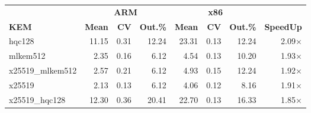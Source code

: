 \begin{table}[!ht]
\begin{tabular}{lrrr|rrr|r}
 \toprule
& \multicolumn{3}{c}{\bfseries ARM} & \multicolumn{3}{c}{\bfseries x86} &\\
\cmidrule(lr){2-4} \cmidrule(lr){5-7}
\textbf{KEM} & \textbf{Mean} & \textbf{CV} & \textbf{Out.\%} & \textbf{Mean} & \textbf{CV} & \textbf{Out.\%} & \textbf{SpeedUp}\\
\midrule
hqc128 & 11.15 & 0.31 & 12.24 & 23.31 & 0.13 & 12.24 & 2.09× \\
mlkem512 & 2.35 & 0.16 & 6.12 & 4.54 & 0.13 & 10.20 & 1.93× \\
x25519_mlkem512 & 2.57 & 0.21 & 6.12 & 4.93 & 0.15 & 12.24 & 1.92× \\
x25519 & 2.13 & 0.13 & 6.12 & 4.06 & 0.12 & 8.16 & 1.91× \\
x25519_hqc128 & 12.30 & 0.36 & 20.41 & 22.70 & 0.13 & 16.33 & 1.85× \\
\bottomrule
\end{tabular}
\end{table}
